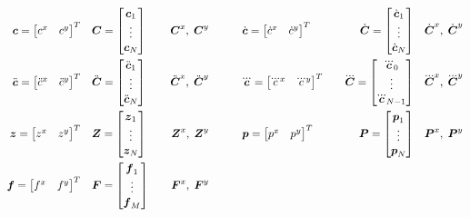 \documentclass[12pt,a4paper]{article}
\begin{document}
\begin{align*}
\cpos = \begin{bmatrix} c^x & c^y \end{bmatrix}^T
\quad&
\cPos = \begin{bmatrix} \cpos_1 \\ \vdots \\ \cpos_N \end{bmatrix}
\quad&
\cPos^x,\; \cPos^y
\quad\quad\quad&
\cvel = \begin{bmatrix} \dot{c}^x & \dot{c}^y \end{bmatrix}^T
\quad&
\cVel = \begin{bmatrix} \cvel_1 \\ \vdots \\ \cvel_N \end{bmatrix}
\quad&
\cVel^x,\; \cVel^y\\
%
\cacc = \begin{bmatrix} \ddot{c}^x & \ddot{c}^y \end{bmatrix}^T
\quad&
\cAcc = \begin{bmatrix} \cacc_1 \\ \vdots \\ \cacc_N \end{bmatrix}
\quad&
\cAcc^x,\; \cAcc^y
\quad\quad\quad&
\cjerk = \begin{bmatrix} \dddot{c}^x & \dddot{c}^y \end{bmatrix}^T
\quad&
\cJerk = \begin{bmatrix} \cjerk_0 \\ \vdots \\ \cjerk_{N-1} \end{bmatrix}
\quad&
\cJerk^x,\; \cJerk^y\\
%
\zmp = \begin{bmatrix} z^x & z^y \end{bmatrix}^T
\quad &
\ZMP = \begin{bmatrix} \zmp_1 \\ \vdots \\ \zmp_N \end{bmatrix}
\quad&
\ZMP^x,\; \ZMP^y
\quad\quad\quad&
\fp = \begin{bmatrix} p^x & p^y \end{bmatrix}^T
\quad &
\FP = \begin{bmatrix} \fp_1 \\ \vdots \\ \fp_N \end{bmatrix}
\quad&
\FP^x,\; \FP^y\\
\fd = \begin{bmatrix} f^x & f^y \end{bmatrix}^T
\quad &
\FD = \begin{bmatrix} \fd_1 \\ \vdots \\ \fd_M \end{bmatrix}
\quad&
\FD^x,\; \FD^y
\quad\quad\quad&
\end{align*}
\end{document}
